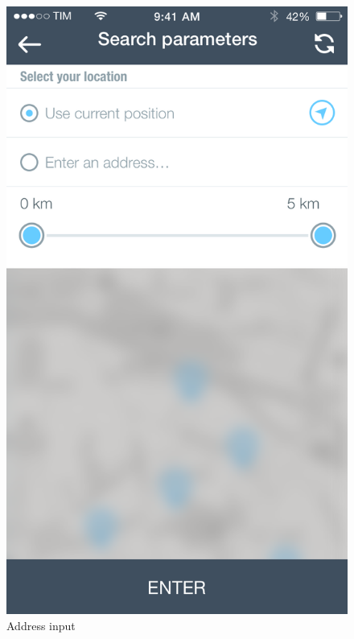 \documentclass[12pt]{article}
\begin{document}
		\begin{figure}
		 \centering	
		 \includegraphics[scale=0.25]{Images/mobileApp/Param.png}
		 \caption{Address input}
		 \endminipage
		 \centering

\end{figure}
\end{document}
